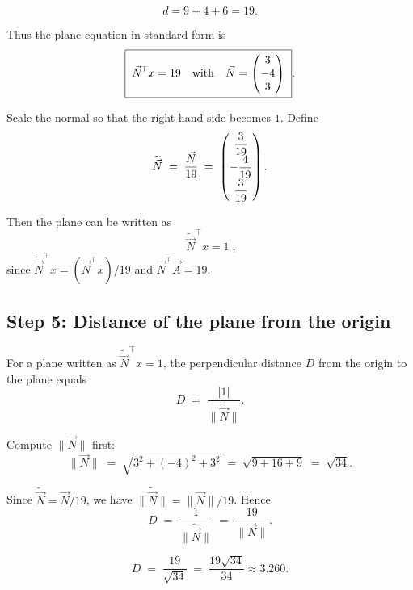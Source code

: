 \documentclass[12pt]{article}
\begin{document}
\begin{equation}
d = 9 + 4 + 6 = 19.
\end{equation}

Thus the plane equation in standard form is
\begin{equation}
\boxed{\; \Vec{N}^{\!\top} x = 19 \quad\text{with}\quad \Vec{N}=\begin{pmatrix}3\\-4\\3\end{pmatrix}\; }.
\end{equation}


Scale the normal so that the right-hand side becomes $1$. Define
\begin{equation}
\widetilde{\Vec{N}} \;=\; \frac{\Vec{N}}{19} \;=\; \begin{pmatrix}\dfrac{3}{19} \\[4pt] -\dfrac{4}{19} \\[4pt] \dfrac{3}{19}\end{pmatrix}.
\end{equation}

Then the plane can be written as
\begin{equation}
\boxed{\; \widetilde{\Vec{N}}^{\!\top} x = 1 \;},
\end{equation}
since $\widetilde{\Vec{N}}^{\!\top} x = (\Vec{N}^{\!\top}x)/19$ and $\Vec{N}^{\!\top}\Vec{A}=19$.

\subsection*{Step 5: Distance of the plane from the origin}
For a plane written as $\widetilde{\Vec{N}}^{\!\top}x = 1$, the perpendicular distance $D$ from the origin to the plane equals
\begin{equation}
D \;=\; \frac{|1|}{\|\widetilde{\Vec{N}}\|}.
\end{equation}

Compute $\|\Vec{N}\|$ first:
\begin{equation}
\|\Vec{N}\| \;=\; \sqrt{3^2 + (-4)^2 + 3^2} \;=\; \sqrt{9+16+9} \;=\; \sqrt{34}.
\end{equation}

Since $\widetilde{\Vec{N}} = \Vec{N}/19$, we have $\|\widetilde{\Vec{N}}\| = \|\Vec{N}\|/19$. Hence
\begin{equation}
D \;=\; \frac{1}{\|\widetilde{\Vec{N}}\|} \;=\; \frac{19}{\|\Vec{N}\|}.
\end{equation}

\begin{equation}
\boxed{D \;=\; \frac{19}{\sqrt{34}} \;=\; \frac{19\sqrt{34}}{34} \approx 3.260}.
\end{equation}
\end{document}
